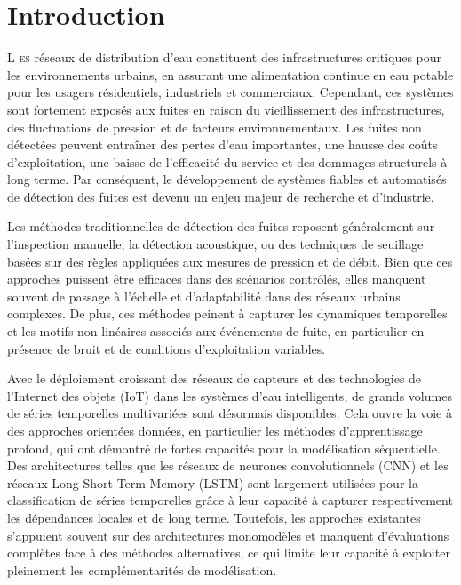 \section{Introduction}

\lettrine[lines=2]{\color{titleblue}L}{ es} réseaux de distribution d'eau constituent des infrastructures critiques pour les environnements urbains, en assurant une alimentation continue en eau potable pour les usagers résidentiels, industriels et commerciaux. Cependant, ces systèmes sont fortement exposés aux fuites en raison du vieillissement des infrastructures, des fluctuations de pression et de facteurs environnementaux. Les fuites non détectées peuvent entraîner des pertes d'eau importantes, une hausse des coûts d'exploitation, une baisse de l'efficacité du service et des dommages structurels à long terme. Par conséquent, le développement de systèmes fiables et automatisés de détection des fuites est devenu un enjeu majeur de recherche et d'industrie.

Les méthodes traditionnelles de détection des fuites reposent généralement sur l'inspection manuelle, la détection acoustique, ou des techniques de seuillage basées sur des règles appliquées aux mesures de pression et de débit. Bien que ces approches puissent être efficaces dans des scénarios contrôlés, elles manquent souvent de passage à l'échelle et d'adaptabilité dans des réseaux urbains complexes. De plus, ces méthodes peinent à capturer les dynamiques temporelles et les motifs non linéaires associés aux événements de fuite, en particulier en présence de bruit et de conditions d'exploitation variables.

Avec le déploiement croissant des réseaux de capteurs et des technologies de l'Internet des objets (IoT) dans les systèmes d'eau intelligents, de grands volumes de séries temporelles multivariées sont désormais disponibles. Cela ouvre la voie à des approches orientées données, en particulier les méthodes d'apprentissage profond, qui ont démontré de fortes capacités pour la modélisation séquentielle. Des architectures telles que les réseaux de neurones convolutionnels (CNN) et les réseaux Long Short-Term Memory (LSTM) sont largement utilisées pour la classification de séries temporelles grâce à leur capacité à capturer respectivement les dépendances locales et de long terme. Toutefois, les approches existantes s'appuient souvent sur des architectures monomodèles et manquent d'évaluations complètes face à des méthodes alternatives, ce qui limite leur capacité à exploiter pleinement les complémentarités de modélisation.

